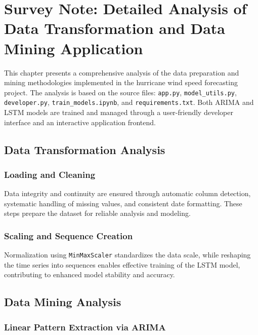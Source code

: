 





\chapter{Survey Note: Detailed Analysis of Data Transformation and Data Mining Application}

This chapter presents a comprehensive analysis of the data preparation and mining methodologies implemented in the hurricane wind speed forecasting project. The analysis is based on the source files: \texttt{app.py}, \texttt{model\_utils.py}, \texttt{developer.py}, \texttt{train\_models.ipynb}, and \texttt{requirements.txt}. Both ARIMA and LSTM models are trained and managed through a user-friendly developer interface and an interactive application frontend.

\section{Data Transformation Analysis}

\subsection{Loading and Cleaning}

Data integrity and continuity are ensured through automatic column detection, systematic handling of missing values, and consistent date formatting. These steps prepare the dataset for reliable analysis and modeling.

\subsection{Scaling and Sequence Creation}

Normalization using \texttt{MinMaxScaler} standardizes the data scale, while reshaping the time series into sequences enables effective training of the LSTM model, contributing to enhanced model stability and accuracy.

\section{Data Mining Analysis}

\subsection{Linear Pattern Extraction via ARIMA}

